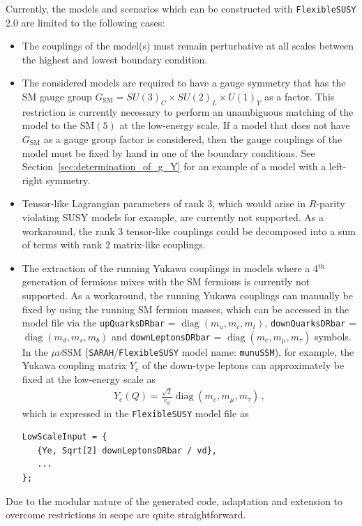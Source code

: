 \documentclass[final,3p,11pt,pdflatex]{elsarticle}
\makeatletter
\newcommand{\modelname}[1]{\texttt{#1}\@\xspace}
\newcommand{\sarah}{\texttt{SARAH}\@\xspace}
\newcommand{\fs}{\texttt{FlexibleSUSY}\@\xspace}
\newcommand{\fstwo}{\fs 2.0\@\xspace}
\newcommand{\code}[1]{\lstinline|#1|}  %
\newcommand{\SM}{\ensuremath{\text{SM}}\xspace}
\newcommand{\secref}[1]{Section~\ref{#1}}
\newcommand{\GSM}{\ensuremath{G_{\SM}}\xspace}
\DeclareMathOperator{\diag}{diag}
\makeatother
\begin{document}
Currently, the models and scenarios which can be constructed with
\fstwo are limited to the following cases:
%
\begin{itemize}
\item The couplings of the model(s) must remain perturbative at all
  scales between the highest and lowest boundary condition.
\item The considered models are required to have a gauge symmetry
  that has the SM gauge group
  $\GSM = SU(3)_C\times SU(2)_L\times U(1)_Y$ as a factor.  This
  restriction is currently necessary to perform an unambiguous
  matching of the model to the $\SM(5)$ at the low-energy scale.  If a
  model that does not have $\GSM$ as a gauge group
  factor is considered, then the gauge couplings of the model must be fixed
  by hand in one of the boundary conditions.  See
  \secref{sec:determination_of_g_Y} for an example of a model with a
  left-right symmetry.
\item Tensor-like Lagrangian parameters of rank 3, which would arise
  in $R$-parity violating SUSY models for example, are currently not
  supported.  As a workaround, the rank 3 tensor-like couplings could
  be decomposed into a sum of terms with rank 2 matrix-like couplings.
\item The extraction of the running Yukawa couplings in models where
  a 4$^\text{th}$ generation of fermions mixes with the SM fermions is currently
  not supported.  As a workaround, the running Yukawa couplings can
  manually be fixed by using the running SM fermion masses, which can
  be accessed in the model file via the \code{upQuarksDRbar} =
  $\diag(m_u, m_c, m_t)$, \code{downQuarksDRbar} =
  $\diag(m_d, m_s, m_b)$ and \code{downLeptonsDRbar} =
  $\diag(m_e, \allowbreak m_\mu, \allowbreak m_\tau)$ symbols.  In the
  $\mu\nu$SSM \cite{LopezFogliani:2005yw} (\sarah/\fs model name:
  \modelname{munuSSM}), for example, the Yukawa coupling matrix $Y_e$ of
  the down-type leptons can approximately be fixed at the low-energy
  scale as
  \begin{align}
    Y_e(Q) = \frac{\sqrt{2}}{v_d} \diag(m_e, m_\mu, m_\tau) \,,
  \end{align}
  which is expressed in the \fs model file as
  \begin{lstlisting}
LowScaleInput = {
   {Ye, Sqrt[2] downLeptonsDRbar / vd},
   ...
};
  \end{lstlisting}
\end{itemize}
%
Due to the modular nature of the generated code, adaptation and extension
to overcome restrictions in scope are quite straightforward.
\end{document}
